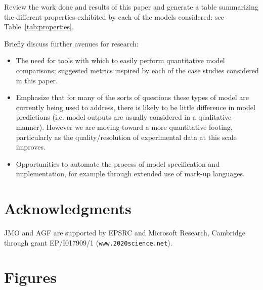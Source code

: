 \documentclass[12pt]{article}
\begin{document}
Review the work done and results of this paper and generate a table summarizing the different properties exhibited by each of the models considered: see Table~\ref{tab:properties}.

\noindent Briefly discuss further avenues for research:
\begin{itemize}
\item The need for tools with which to easily perform quantitative model comparisons; suggested metrics inspired by each of the case studies considered in this paper.
\item Emphasize that for many of the sorts of questions these types of model are currently being used to address, there is likely to be little difference in model predictions (i.e. model outputs are usually considered in a qualitative manner). However we are moving toward a more quantitative footing, particularly as the quality/resolution of experimental data at this scale improves.
\item Opportunities to automate the process of model specification and implementation, for example through extended use of mark-up languages.
\end{itemize}


\section*{Acknowledgments}

JMO and AGF are supported by EPSRC and Microsoft Research, Cambridge through grant EP/I017909/1 ({\tt www.2020science.net}). 






\clearpage
\section{Figures}

\end{document}
